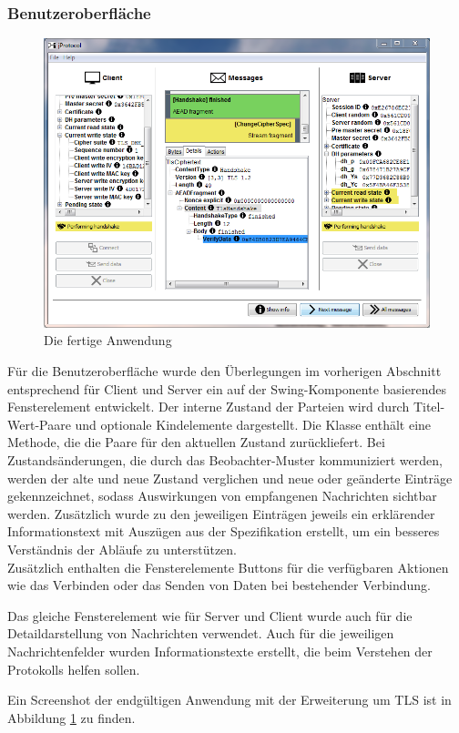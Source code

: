 \subsubsection{Benutzeroberfläche}
\begin{figure}
	\centering
	\includegraphics[scale=0.7]{Diagrams/ScreenshotTLS.png} 
	\caption{Die fertige Anwendung}
	\label{fig_application_screenshot}
\end{figure}

Für die Benutzeroberfläche wurde den Überlegungen im vorherigen Abschnitt entsprechend für Client und Server ein auf der Swing-Komponente  basierendes Fensterelement entwickelt. Der interne Zustand der Parteien wird durch Titel-Wert-Paare und optionale Kindelemente dargestellt. Die Klasse  enthält eine Methode, die die Paare für den aktuellen Zustand zurückliefert. Bei Zustandsänderungen, die durch das Beobachter-Muster kommuniziert werden, werden der alte und neue Zustand verglichen und neue oder geänderte Einträge gekennzeichnet, sodass Auswirkungen von empfangenen Nachrichten sichtbar werden. Zusätzlich wurde zu den jeweiligen Einträgen jeweils ein erklärender Informationstext mit Auszügen aus der Spezifikation erstellt, um ein besseres Verständnis der Abläufe zu unterstützen.\\
Zusätzlich enthalten die Fensterelemente Buttons für die verfügbaren Aktionen wie das Verbinden oder das Senden von Daten bei bestehender Verbindung.

Das gleiche Fensterelement wie für Server und Client wurde auch für die Detaildarstellung von Nachrichten verwendet. Auch für die jeweiligen Nachrichtenfelder wurden Informationstexte erstellt, die beim Verstehen der Protokolls helfen sollen.

Ein Screenshot der endgültigen Anwendung mit der Erweiterung um TLS ist in Abbildung \ref{fig_application_screenshot} zu finden.